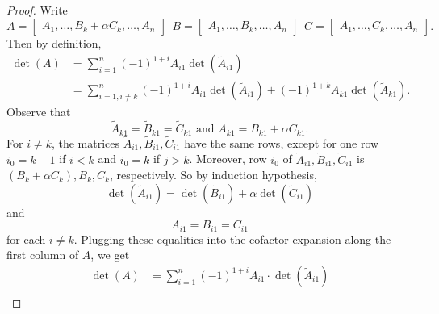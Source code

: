 \documentclass[linearalgebraI]{subfiles}
\begin{document}
    \begin{proof}
        Write
        \begin{equation*}
            A = \begin{bmatrix}
                A_1, \ldots, B_k+\alpha C_k, \ldots, A_n
            \end{bmatrix}
            \ \ B =
            \begin{bmatrix}
                A_1, \ldots, B_k, \ldots, A_n
            \end{bmatrix}
            \ \ C =  
            \begin{bmatrix}
                A_1, \ldots, C_k, \ldots, A_n
            \end{bmatrix}.
        \end{equation*}
        Then by definition,
        \begin{align*}
            \det (A) & = \sum^n_{i=1} (-1)^{1+i} A_{i1} \det \left(\widetilde{A}_{i1}\right) \\
                     & = \sum^n_{i=1, i\neq k} (-1)^{1+i} A_{i1} \det \left(\widetilde{A}_{i1}\right) + (-1)^{1+k} A_{k1} \det \left(\widetilde{A}_{k1}\right).
        \end{align*}
        Observe that
        \begin{equation*}
            \widetilde{A}_{k1} = \widetilde{B}_{k1} = \widetilde{C}_{k1} \text{\ \ and\ \ } A_{k1} = B_{k1} + \alpha C_{k1}.
        \end{equation*}
        For $i\neq k$, the matrices $\widetilde{A}_{i1}, \widetilde{B}_{i1}, \widetilde{C}_{i1}$ have the same rows, except for one row $i_0 = k-1$ if $i<k$ and $i_0 = k$ if $j>k$. Moreover, row $i_0$ of $\widetilde{A}_{i1}, \widetilde{B}_{i1}, \widetilde{C}_{i1}$ is $(B_k + \alpha C_k), B_k, C_k$, respectively. So by induction hypothesis, 
        \begin{equation*}
            \det \left(\widetilde{A}_{i1}\right) = \det \left(\widetilde{B}_{i1}\right) + \alpha \det \left(\widetilde{C}_{i1}\right)
        \end{equation*}
        and
        \begin{equation*}
            A_{i1} = B_{i1} = C_{i1}
        \end{equation*}
        for each $i\neq k$. Plugging these equalities into the cofactor expansion along the first column of $A$, we get
        \begin{align*}
            \det (A) & = \sum^n_{i=1} (-1)^{1+i} A_{i1} \cdot \det \left(\widetilde{A}_{i1}\right) \\

\end{align*}
\end{proof}
\end{document}
